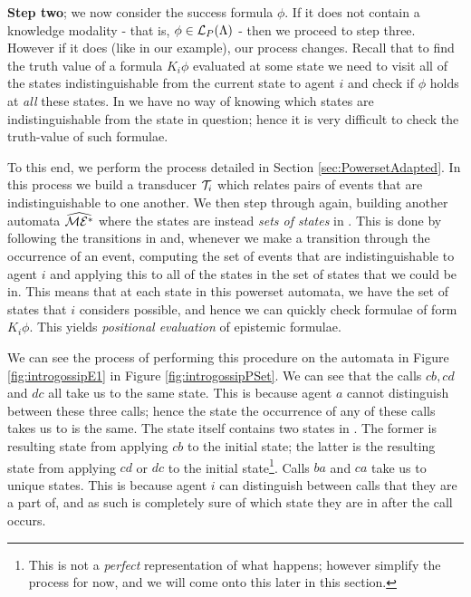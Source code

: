 \documentclass[10pt, a4paper]{report}
\begin{document}
\textbf{Step two}; we now consider the success formula $\phi$. If it does not
contain a knowledge modality - that is, $\phi \in \mathcal{L}_P(\Lambda)$ - then we
proceed to step three. However if it does (like in our example), our process
changes. Recall that to find the truth value of a formula $K_i \phi$ evaluated at
some state we need to visit all of the states indistinguishable from the current
state to agent $i$ and check if $\phi$ holds at \emph{all} these states. In
\mestar we have no way of knowing which states are indistinguishable from the
state in question; hence it is very difficult to check the truth-value of such
formulae.

To this end, we perform the process detailed in Section
\ref{sec:PowersetAdapted}. In this process we build a transducer $\mathcal{T}_i$
which relates pairs of events that are indistinguishable to one another. We then
step through \mestar again, building another automata $\widehat{\mathcal{ME^\ast}}$ where
the states are instead \emph{sets of states} in \mestar. This is done by
following the transitions in \mestar and, whenever we make a transition through
the occurrence of an event, computing the set of events that are
indistinguishable to agent $i$ and applying this to all of the states in the set
of states that we could be in. This means that at each state in this powerset
automata, we have the set of states that $i$ considers possible, and hence we
can quickly check formulae of form $K_i \phi$. This yields \emph{positional
  evaluation} of epistemic formulae.

We can see the process of performing this procedure on the automata in Figure
\ref{fig:introgossipE1} in Figure \ref{fig:introgossipPSet}. We can see that the
calls $cb, cd$ and $dc$ all take us to the same state. This is because agent $a$
cannot distinguish between these three calls; hence the state the occurrence of
any of these calls takes us to is the same. The state itself contains two states
in \mestar. The former is resulting state from applying $cb$ to the initial
state; the latter is the resulting state from applying $cd$ or $dc$ to the
initial state\footnote{This is not a \emph{perfect} representation of
  what happens; however simplify the process for now, and we will come onto this
  later in this section.}. Calls $ba$ and $ca$ take us to unique states. This is
because agent $i$ can distinguish between calls that they are a part of, and as
such is completely sure of which state they are in after the call occurs.
\end{document}
